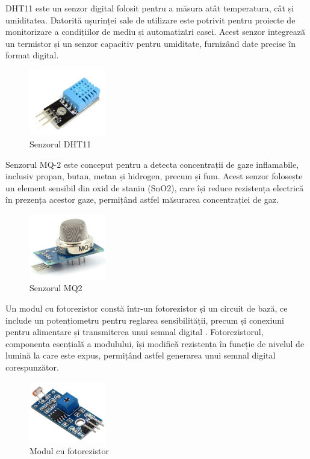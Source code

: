 DHT11 este un senzor digital folosit pentru a măsura atât temperatura, cât și umiditatea. Datorită ușurinței sale de utilizare este potrivit pentru proiecte de monitorizare a condițiilor de mediu și automatizări casei. Acest senzor integrează un termistor și un senzor capacitiv pentru umiditate, furnizând date precise în format digital.

\begin{figure}[H]
\includegraphics[width=0.3\textwidth, height=0.3\textwidth]{images/dht11.png}
\caption{Senzorul DHT11\cite{dht_poza}}
\label{fig:dht11}
\end{figure}

Senzorul MQ-2 este conceput pentru a detecta concentrații de gaze inflamabile, inclusiv propan, butan, metan și hidrogen, precum și fum. Acest senzor folosește un element sensibil din oxid de staniu (SnO2), care își reduce rezistența electrică în prezența acestor gaze, permițând astfel măsurarea concentrației de gaz.

\begin{figure}[H]
\includegraphics[width=0.3\textwidth, height=0.3\textwidth]{images/mq2.png}
\caption{Senzorul MQ2\cite{mq_poza}}
\label{fig:mq2}
\end{figure}

Un modul cu fotorezistor constă într-un fotorezistor și un circuit de bază, ce include un potențiometru pentru reglarea sensibilității, precum și conexiuni pentru alimentare și transmiterea unui semnal digital . Fotorezistorul, componenta esențială a modulului, își modifică rezistența în funcție de nivelul de lumină la care este expus, permițând astfel generarea unui semnal digital corespunzător.

\begin{figure}[H]
\includegraphics[width=0.3\textwidth, height=0.3\textwidth]{images/senz_lumina.png}
\caption{Modul cu fotorezistor\cite{senzlum_poza}}
\label{fig:senz_lumina}
\end{figure}

